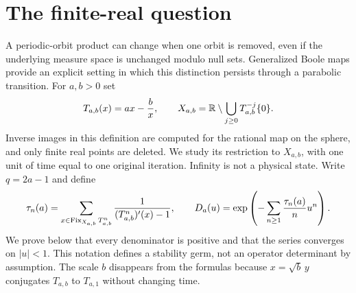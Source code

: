 \section{The finite-real question}

A periodic-orbit product can change when one orbit is removed, even if the
underlying measure space is unchanged modulo null sets. Generalized Boole maps
provide an explicit setting in which this distinction persists through a
parabolic transition. For $a,b>0$ set
\begin{equation}\label{eq:domain}
 T_{a,b}(x)=ax-\frac b x,
 \qquad X_{a,b}=\mathbb R\setminus\bigcup_{j\ge0}T_{a,b}^{-j}\{0\}.
\end{equation}
Inverse images in this definition are computed for the rational map on the
sphere, and only finite real points are deleted. We study its restriction to
$X_{a,b}$, with one unit of time equal to one original iteration. Infinity is
not a physical state. Write $q=2a-1$ and define
\begin{equation}\label{eq:definition}
 \tau_n(a)=\sum_{x\in\operatorname{Fix}_{X_{a,b}} T_{a,b}^n}
 \frac{1}{(T_{a,b}^n)'(x)-1},\qquad
 D_a(u)=\exp\left(-\sum_{n\ge1}\frac{\tau_n(a)}n u^n\right).
\end{equation}
We prove below that every denominator is positive and that the series converges
on $|u|<1$. This notation defines a stability germ, not an operator determinant
by assumption. The scale $b$ disappears from the formulas because
$x=\sqrt b\,y$ conjugates $T_{a,b}$ to $T_{a,1}$ without changing time.

